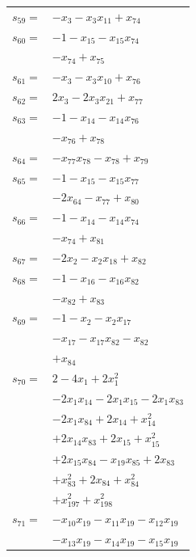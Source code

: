 \begin{longtable}{@{}r@{\;}l@{}}
\(s_{59}=\) & \(\displaystyle -x_{3} -x_{3}x_{11} +x_{74}\) \\[3pt]
\(s_{60}=\) & \(\displaystyle -1 -x_{15} -x_{15}x_{74}\) \\
 & \(\displaystyle -x_{74} +x_{75}\) \\[3pt]
\(s_{61}=\) & \(\displaystyle -x_{3} -x_{3}x_{10} +x_{76}\) \\[3pt]
\(s_{62}=\) & \(\displaystyle 2x_{3} -2x_{3}x_{21} +x_{77}\) \\[3pt]
\(s_{63}=\) & \(\displaystyle -1 -x_{14} -x_{14}x_{76}\) \\
 & \(\displaystyle -x_{76} +x_{78}\) \\[3pt]
\(s_{64}=\) & \(\displaystyle -x_{77}x_{78} -x_{78} +x_{79}\) \\[3pt]
\(s_{65}=\) & \(\displaystyle -1 -x_{15} -x_{15}x_{77}\) \\
 & \(\displaystyle -2x_{64} -x_{77} +x_{80}\) \\[3pt]
\(s_{66}=\) & \(\displaystyle -1 -x_{14} -x_{14}x_{74}\) \\
 & \(\displaystyle -x_{74} +x_{81}\) \\[3pt]
\(s_{67}=\) & \(\displaystyle -2x_{2} -x_{2}x_{18} +x_{82}\) \\[3pt]
\(s_{68}=\) & \(\displaystyle -1 -x_{16} -x_{16}x_{82}\) \\
 & \(\displaystyle -x_{82} +x_{83}\) \\[3pt]
\(s_{69}=\) & \(\displaystyle -1 -x_{2} -x_{2}x_{17}\) \\
 & \(\displaystyle -x_{17} -x_{17}x_{82} -x_{82}\) \\
 & \(\displaystyle +x_{84}\) \\[3pt]
\(s_{70}=\) & \(\displaystyle 2 -4x_{1} +2x_{1}^{2}\) \\
 & \(\displaystyle -2x_{1}x_{14} -2x_{1}x_{15} -2x_{1}x_{83}\) \\
 & \(\displaystyle -2x_{1}x_{84} +2x_{14} +x_{14}^{2}\) \\
 & \(\displaystyle +2x_{14}x_{83} +2x_{15} +x_{15}^{2}\) \\
 & \(\displaystyle +2x_{15}x_{84} -x_{19}x_{85} +2x_{83}\) \\
 & \(\displaystyle +x_{83}^{2} +2x_{84} +x_{84}^{2}\) \\
 & \(\displaystyle +x_{197}^{2} +x_{198}^{2}\) \\[3pt]
\(s_{71}=\) & \(\displaystyle -x_{10}x_{19} -x_{11}x_{19} -x_{12}x_{19}\) \\
 & \(\displaystyle -x_{13}x_{19} -x_{14}x_{19} -x_{15}x_{19}\) \\

\end{longtable}

